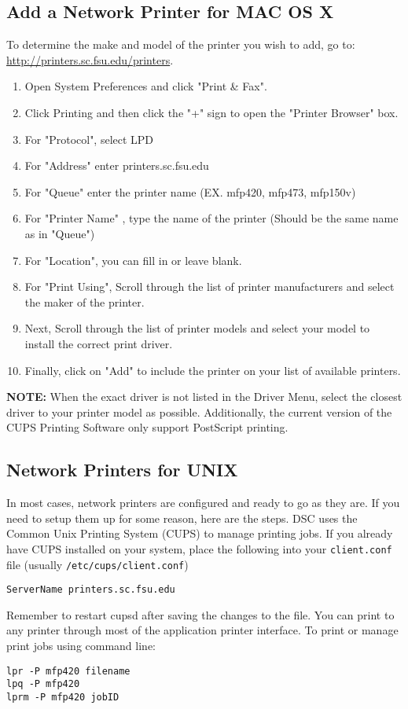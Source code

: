 \documentclass[12pt,a4paper]{article}
\begin{document}
\subsection*{Add a Network Printer for MAC OS X}
To determine the make and model of the printer you wish to add, go to: \url{http://printers.sc.fsu.edu/printers}.
\begin{enumerate}
    \item Open System Preferences and click "Print \& Fax".
    \item Click Printing and then click the "+" sign to open the "Printer Browser" box.
    \item For "Protocol", select LPD
    \item For "Address" enter printers.sc.fsu.edu
    \item For "Queue" enter the printer name (EX. mfp420, mfp473, mfp150v)
    \item For "Printer Name" , type the name of the printer (Should be the same name as in "Queue")
    \item For "Location", you can fill in or leave blank.
    \item For "Print Using", Scroll through the list of printer manufacturers and select the maker of the printer.
    \item Next, Scroll through the list of printer models and select your model to install the correct print driver.
    \item Finally, click on "Add" to include the printer on your list of available printers.
\end{enumerate}
\textbf{NOTE:} When the exact driver is not listed in the Driver Menu, select the closest driver to your printer model as possible. Additionally, the current version of the CUPS Printing Software only support PostScript printing.

\subsection*{Network Printers for UNIX}
In most cases, network printers are configured and ready to go as they are. If you need to setup them up for some reason, here are the steps.
DSC uses the Common Unix Printing System (CUPS) to manage printing jobs. If you already have CUPS installed on your system, place the following into your \texttt{client.conf} file (usually \texttt{/etc/cups/client.conf})
\begin{verbatim}
ServerName printers.sc.fsu.edu
\end{verbatim}
Remember to restart cupsd after saving the changes to the file.
You can print to any printer through most of the application printer interface. To print or manage print jobs using command line:
\begin{verbatim}
lpr -P mfp420 filename
lpq -P mfp420
lprm -P mfp420 jobID
\end{verbatim}
\end{document}
